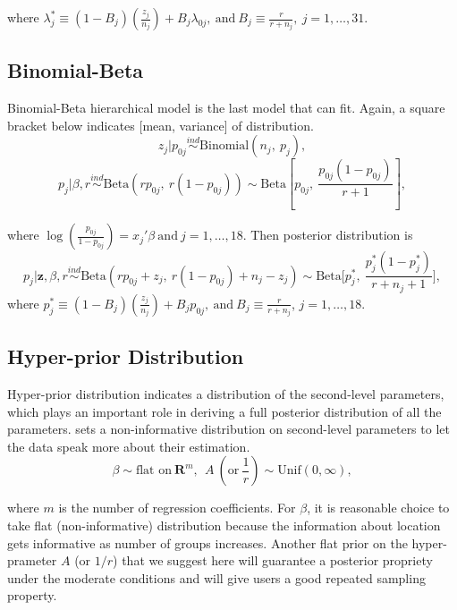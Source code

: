 \documentclass[article]{jss}
\begin{document}
where $\lambda^{\ast}_{j} \equiv (1-B_{j})(\frac{z_{j}}{n_{j}}) + B_{j}\lambda_{0j},~\textrm{and}~ B_{j}\equiv \frac{r}{r+n_{j}},~ j=1, \ldots, 31$. 

\subsection[Binomial-Beta]{Binomial-Beta}
Binomial-Beta hierarchical model is the last model that  can fit. Again, a square bracket below indicates [mean, variance] of distribution.
\begin{displaymath}
z_{j} \vert p_{0j}\stackrel{ind}{\sim}\textrm{Binomial}(n_{j}, ~p_{j}),
\end{displaymath}
\begin{displaymath}
p_{j} \vert \beta, r\stackrel{ind}{\sim}\textrm{Beta}(rp_{0j},~ r(1-p_{0j}))\sim \textrm{Beta}[p_{0j}, ~\frac{p_{0j}(1-p_{0j})}{r + 1}],
\end{displaymath}

where $\log(\frac{p_{0j}}{1-p_{0j}}) =x_{j}'\beta~\textrm{and}~j=1, \ldots, 18$. Then posterior distribution is
\begin{displaymath}
p_{j}\vert \textbf{z}, \beta, r \stackrel{ind}{\sim}\textrm{Beta}(rp_{0j}+z_{j},~r(1-p_{0j})+n_{j}-z_{j})\sim\textrm{Beta}\bigg[p^{\ast}_{j},~ \frac{p^{\ast}_{j}(1-p^{\ast}_{j})}{r+n_{j}+1}\bigg],
\end{displaymath}
where $p^{\ast}_{j}\equiv(1-B_{j})(\frac{z_{j}}{n_{j}})+B_{j}p_{0j},~ \textrm{and}~ B_{j}\equiv\frac{r}{r+n_{j}}$, $j=1,\ldots,18$.


\subsection[Hyper-prior Distribution]{Hyper-prior Distribution}
Hyper-prior distribution indicates a distribution of the second-level parameters, which plays an important role in deriving a full posterior distribution of all the parameters.  sets a non-informative distribution on second-level parameters to let the data speak more about their estimation.
\begin{displaymath}
\beta \sim \textrm{flat on}~ \mathbf{R}^{m},~~A ~(\textrm{or}~ \frac{1}{r})\sim \textrm{Unif}(0, \infty),
\end{displaymath}

where $m$ is the number of regression coefficients. For $\beta$, it is reasonable choice to take flat (non-informative) distribution because the information about location gets informative as number of groups increases. Another flat prior on the hyper-prameter $A$ (or $1/r$) that we suggest here will guarantee a posterior propriety under the moderate conditions and will give users a good repeated sampling property.
\\
\end{document}
